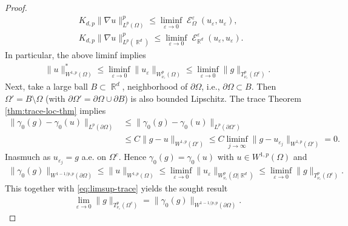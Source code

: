 \documentclass[12pt, reqno]{amsart}%
\theoremstyle{plain}  %
\theoremstyle{definition}  %
\numberwithin{equation}{section}
\DeclareMathOperator{\cE}{\mathcal{E}}
\DeclareMathOperator{\R}{\mathbb{R}}
\newcommand{\eps}{\varepsilon}
\begin{document}
\begin{proof}
\begin{align*}
&K_{d,p}\|\nabla u\|^p_{L^p(\Omega)}\leq\liminf_{\eps\to0} \cE_{\Omega}^{\eps}(u_\eps,u_\eps),\\
&K_{d,p}\|\nabla u\|^p_{L^p(\R^d)}\leq\liminf_{\eps\to0} \cE_{\R^d}^{\eps}(u_\eps,u_\eps).
\end{align*}
In particular, the above liminf implies
\begin{align*}
\|u\|^*_{W^{1,p}(\Omega)}\leq \liminf_{\eps\to0} \|u_{\eps}\|_{W^{p}_{\nu_\eps}(\Omega)}\leq  \liminf_{\eps\to0} \|g\|_{T^{p}_{\nu_\eps}(\Omega^c)}.
\end{align*}
Next, take a large ball $B\subset \R^d$, neighborhood of $\partial\Omega$, i.e., $\partial \Omega\subset B$. Then $\Omega'=B\setminus \Omega$ (with $\partial\Omega'=\partial \Omega\cup \partial B$)  is also bounded Lipschitz. The  trace Theorem \ref{thm:trace-loc-thm} implies
\begin{align*}
\|\gamma_0(g)-\gamma_0(u)\|_{L^p(\partial\Omega)}
&\leq \|\gamma_0(g)-\gamma_0(u)\|_{L^p(\partial\Omega')}\\
& \leq C\|g-u\|_{W^{1,p}(\Omega')}\leq C
\liminf_{j \to\infty} \|g-u_{\eps_j}\|_{W^{1,p}(\Omega')}=0.
\end{align*}
Inasmuch as  $u_{\eps_j}=g$ a.e. on $\Omega^c$.
Hence   $\gamma_0(g)=\gamma_0(u)$ with $u\in W^{1,p}(\Omega)$ and
\begin{align*}
\|\gamma_0(g)\|_{W^{1-1/p ,p}(\partial\Omega)}\leq \|u\|_{W^{1,p}(\Omega)}\leq \liminf_{\eps\to0} \|u_{\eps}\|_{W^{p}_{\nu_\eps}(\Omega|\R^d)}
\leq  \liminf_{\eps\to0} \|g\|_{T^{p}_{\nu_\eps}(\Omega^c)}.
\end{align*}
This together with \eqref{eq:limsup-trace} yields  the sought result
\begin{align*}
\lim_{\eps\to0} \|g\|_{T^{p}_{\nu_\eps}(\Omega^c)}= \|\gamma_0(g)\|_{W^{1-1/p ,p}(\partial\Omega)}.
\end{align*}
\end{proof}
\end{document}
